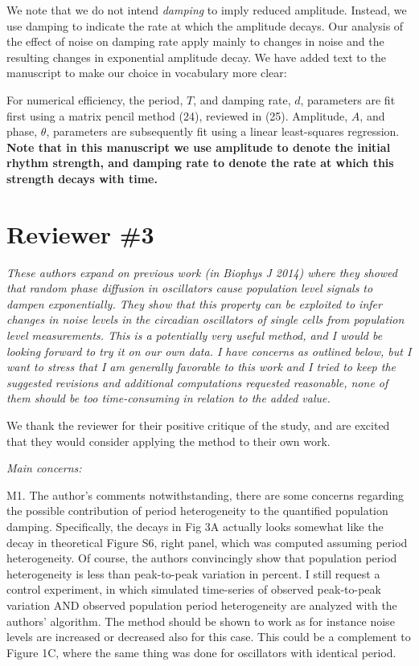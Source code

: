 \documentclass[11pt, letterpaper]{article}
\newenvironment{reviewer}{\itshape\color{gray}}{}
\newenvironment{manuscript}[1]{\begin{center}\begin{tcolorbox}[colback=green!5!white,colframe=green!75!black,width=\textwidth,title={#1},breakable,fonttitle=\bfseries]}{\end{tcolorbox}\end{center}}
\begin{document}
We note that we do not intend {\itshape damping} to imply reduced amplitude.
Instead, we use damping to indicate the rate at which the amplitude decays.
Our analysis of the effect of noise on damping rate apply mainly to changes in noise and the resulting changes in exponential amplitude decay. We have added text to the manuscript to make our choice in vocabulary more clear:

\begin{manuscript}{Page 4}
 For numerical efficiency, the period, $T$, and damping rate, $d$, parameters are fit first using a matrix pencil method (24), reviewed in (25).
Amplitude, $A$, and phase, $\theta$, parameters are subsequently fit using a linear least-squares regression.
{\bfseries
Note that in this manuscript we use amplitude to denote the initial rhythm strength, and damping rate to denote the rate at which this strength decays with time.}
\end{manuscript}

\section*{Reviewer \#3}

\begin{reviewer}
These authors expand on previous work (in Biophys J 2014) where they showed that random phase diffusion in oscillators cause population level signals to dampen exponentially. They show that this property can be exploited to infer changes in noise levels in the circadian oscillators of single cells from population level measurements. This is a potentially very useful method, and I would be looking forward to try it on our own data. I have concerns as outlined below, but I want to stress that I am generally favorable to this work and I tried to keep the suggested revisions and additional computations requested reasonable, none of them should be too time-consuming in relation to the added value.
\end{reviewer}

We thank the reviewer for their positive critique of the study, and are excited that they would consider applying the method to their own work.

\begin{reviewer}
Main concerns:

M1. The author's comments notwithstanding, there are some concerns regarding the possible contribution of period heterogeneity to the quantified population damping. Specifically, the decays in Fig 3A actually looks somewhat like the decay in theoretical Figure S6, right panel, which was computed assuming period heterogeneity. Of course, the authors convincingly show that population period heterogeneity is less than peak-to-peak variation in percent. I still request a control experiment, in which simulated time-series of observed peak-to-peak variation AND observed population period heterogeneity are analyzed with the authors' algorithm. The method should be shown to work as for instance noise levels are increased or decreased also for this case. This could be a complement to Figure 1C, where the same thing was done for oscillators with identical period.
\end{reviewer}
\end{document}
